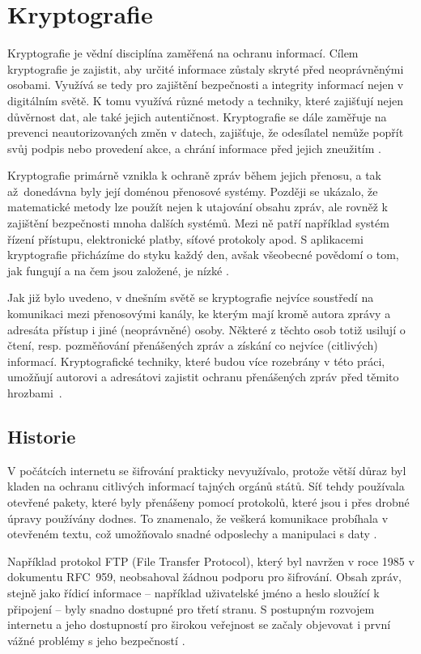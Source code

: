 \section{Kryptografie}
Kryptografie je vědní disciplína zaměřená na ochranu informací. Cílem kryptografie je zajistit, aby určité informace zůstaly skryté před neoprávněnými osobami. Využívá se tedy pro zajištění bezpečnosti a integrity informací nejen v digitálním světě. K tomu využívá různé metody a techniky, které zajišťují nejen důvěrnost dat, ale také jejich autentičnost. Kryptografie se dále zaměřuje na prevenci neautorizovaných změn v datech, zajišťuje, že odesílatel nemůže popřít svůj podpis nebo provedení akce, a chrání informace před jejich zneužitím \parencite{tesar2021}.

Kryptografie primárně vznikla k ochraně zpráv během jejich přenosu, a tak až~donedávna byly její doménou přenosové systémy. Později se ukázalo, že matematické metody lze použít nejen k utajování obsahu zpráv, ale rovněž k zajištění bezpečnosti mnoha dalších systémů. Mezi ně patří například systém řízení přístupu, elektronické platby, síťové protokoly apod. S aplikacemi kryptografie přicházíme do styku každý den, avšak všeobecné povědomí o tom, jak fungují a na čem jsou založené, je nízké \parencite{burda2019}.

Jak již bylo uvedeno, v dnešním světě se kryptografie nejvíce soustředí na komunikaci mezi přenosovými kanály, ke kterým mají kromě autora zprávy a adresáta přístup i jiné (neoprávněné) osoby. Některé z těchto osob totiž usilují o čtení, resp. pozměňování přenášených zpráv a získání co nejvíce (citlivých) informací. Kryptografické techniky, které budou více rozebrány v této práci, umožňují autorovi a adresátovi zajistit ochranu přenášených zpráv před těmito hrozbami~\mbox{\parencite{sedlak2021}.}

\subsection{Historie}

V počátcích internetu se šifrování prakticky nevyužívalo, protože větší důraz byl kladen na ochranu citlivých informací tajných orgánů států. Síť tehdy používala otevřené pakety, které byly přenášeny pomocí protokolů, které jsou i přes drobné úpravy používány dodnes. To znamenalo, že veškerá komunikace probíhala v otevřeném textu, což umožňovalo snadné odposlechy a manipulaci s daty \mbox{\parencite{erben2014}.}

Například protokol FTP (File Transfer Protocol), který byl navržen v roce 1985 v dokumentu RFC~959, neobsahoval žádnou podporu pro šifrování. Obsah zpráv, stejně jako řídicí informace -- například uživatelské jméno a heslo sloužící k připojení -- byly snadno dostupné pro třetí stranu. S postupným rozvojem internetu a jeho dostupností pro širokou veřejnost se začaly objevovat i první vážné problémy s jeho bezpečností \parencite{cerna2012}.

